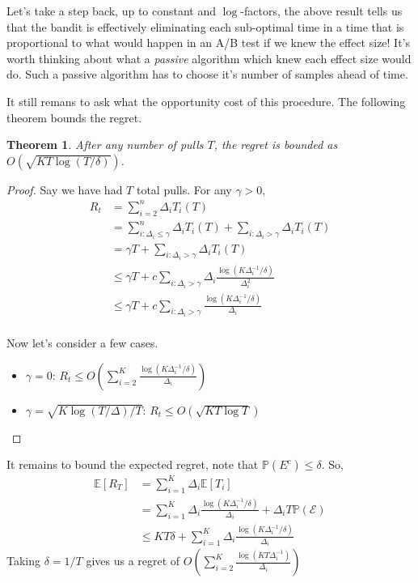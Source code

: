 \documentclass[11pt]{article}
\newtheorem{theorem}{Theorem}
\renewcommand{\P}{\mathbb{P}}
\newcommand{\E}{\mathbb{E}}
\newcommand{\mc}[1]{\mathcal{#1}}
\newcommand{\1}[1]{\mathbf{1}\left\{#1\right\}}
\begin{document}
Let's take a step back, up to constant and $\log$-factors, the above result tells us that the bandit is effectively eliminating each sub-optimal time in a time that is proportional to what would happen in an A/B test if we knew the effect size! It's worth thinking about what a \textit{passive} algorithm which knew each effect size would do. Such a passive algorithm has to choose it's number of samples ahead of time. 


It still remans to ask what the opportunity cost of this procedure. The following theorem bounds the regret. 

\begin{theorem}
    After any number of pulls $T$, the regret is bounded as $O(\sqrt{KT\log(T/\delta)})$.
\end{theorem}
\begin{proof}
    Say we have had $T$ total pulls. For any $\gamma >0$,
    \begin{align*}
        R_t 
        &= \sum_{i=2}^n \Delta_i T_i(T)\tag{$T_i(T)$ denotes the number of pulls up to time $T$}\\
        &= \sum_{i:\Delta_i \leq \gamma}^n \Delta_i T_i(T) +\sum_{i:\Delta_i > \gamma} \Delta_i T_i(T) \\
        &= \gamma T +\sum_{i:\Delta_i > \gamma} \Delta_i T_i(T) \\        
        &\leq \gamma T +c\sum_{i:\Delta_i > \gamma} \Delta_i\frac{\log(K\Delta_i^{-1}/\delta)}{\Delta_i^2} \\        
        &\leq \gamma T +c\sum_{i:\Delta_i > \gamma} \frac{\log(K\Delta_i^{-1}/\delta)}{\Delta_i} \\        
    \end{align*}

Now let's consider a few cases.
\begin{itemize}
    \item $\gamma = 0$: $R_t \leq O\left(\sum_{i=2}^K \frac{\log(K\Delta_i^{-1}/\delta)}{\Delta_i} \right)$
    \item $\gamma = \sqrt{K\log(T/\Delta)/T}$: $R_t \leq O\left(\sqrt{KT\log{T}}\right)$
\end{itemize}
\end{proof}

It remains to bound the expected regret, note that $\P(E^{c}) \leq \delta$. So,
\begin{align*}
    \E[R_T] 
    &= \sum_{i=1}^{K} \Delta_i \E[T_i] \\
    &= \sum_{i=1}^K\Delta_i \frac{\log(K\Delta_i^{-1}/\delta)}{\Delta_i} + \Delta_i T\P(\mc{E}) \\
    &\leq KT\delta + \sum_{i=1}^K\Delta_i \frac{\log(K\Delta_i^{-1}/\delta)}{\Delta_i} 
\end{align*}
Taking $\delta = 1/T$ gives us a regret of $O(\sum_{i=2}^K \frac{\log(K T\Delta_i^{-1})}{\Delta_i})$





\end{document}
